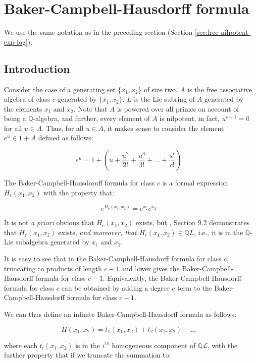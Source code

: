 
\section{Baker-Campbell-Hausdorff formula}\label{sec:bch}

We use the same notation as in the preceding section (Section
\ref{sec:free-nilpotent-exp-log}).

\subsection{Introduction}

Consider the case of a generating set $\{ x_1,x_2 \}$ of size two. $A$
is the free associative algebra of class $c$ generated by
$\{ x_1,x_2 \}$. $L$ is the Lie subring of $A$ generated by the elements
$x_1$ and $x_2$. Note that $A$ is powered over all primes on account
of being a $\mathbb{Q}$-algebra, and further, every element of $A$ is
nilpotent, in fact, $u^{c+1} = 0$ for all $u \in A$. Thus, for all $u \in
A$, it makes sense to consider the element $e^u \in 1 + A$ defined as
follows:

$$e^u = 1 + \left(u + \frac{u^2}{2!} + \frac{u^3}{3!} + \dots + \frac{u^c}{c!}\right)$$

The Baker-Campbell-Hausdoroff formula for class $c$ is a formal
expression $H_c(x_1,x_2)$ with the property that:

$$e^{H_c(x_1,x_2)} = e^{x_1}e^{x_2}$$

It is not {\em a priori} obvious that $H_c(x_1,x_2)$ exists, but
\cite{Khukhro}, Section 9.2 demonstrates that $H_c(x_1,x_2)$ exists, {\em and
moreover, that $H_c(x_1,x_2) \in \mathbb{Q}L$}, i.e., it is in the
$\mathbb{Q}$-Lie subalgebra generated by $x_1$ and $x_2$.

It is easy to see that in the Baker-Campbell-Hausdorff formula for
class $c$, truncating to products of length $c - 1$ and lower gives
the Baker-Campbell-Hausdorff formula for class $c - 1$. Equivalently,
the Baker-Campbell-Hausdorff formula for class $c$ can be obtained by
adding a degree $c$ term to the Baker-Campbell-Hausdorff formula for
class $c - 1$.

We can thus define an infinite Baker-Campbell-Hausdorff formula as follows:

$$H(x_1,x_2) = t_1(x_1,x_2) + t_2(x_1,x_2) + \dots$$

where each $t_i(x_1,x_2)$ is in the $i^{th}$ homogeneous component of
$\mathbb{Q}\mathcal{L}$, with the further property that if we truncate
the summation to:

